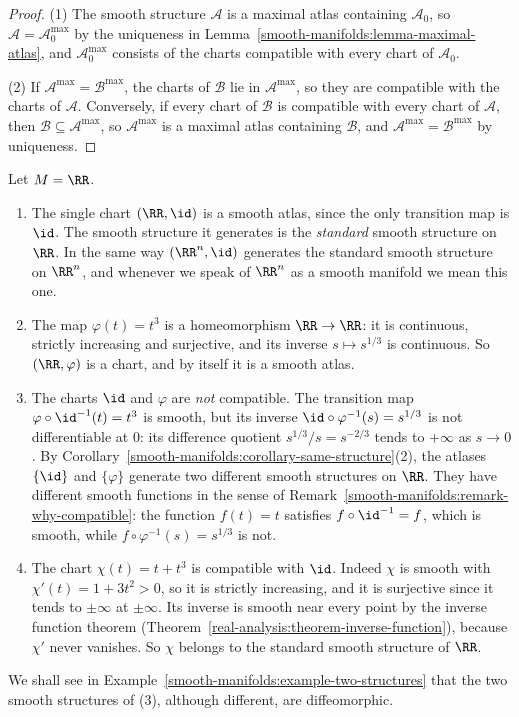 \begin{proof}
(1) The smooth structure $\mathcal{A}$ is a maximal atlas containing $\mathcal{A}_0$, so $\mathcal{A} = \mathcal{A}_0^{\max}$ by the uniqueness in
Lemma~\ref{smooth-manifolds:lemma-maximal-atlas}, and $\mathcal{A}_0^{\max}$ consists of the charts compatible with every chart of $\mathcal{A}_0$.

(2) If $\mathcal{A}^{\max} = \mathcal{B}^{\max}$, the charts of $\mathcal{B}$ lie in $\mathcal{A}^{\max}$, so they are compatible with the charts of
$\mathcal{A}$. Conversely, if every chart of $\mathcal{B}$ is compatible with every chart of $\mathcal{A}$, then $\mathcal{B} \subseteq \mathcal{A}^{\max}$,
so $\mathcal{A}^{\max}$ is a maximal atlas containing $\mathcal{B}$, and $\mathcal{A}^{\max} = \mathcal{B}^{\max}$ by uniqueness.
\end{proof}

\begin{example}\label{smooth-manifolds:example-atlases-line}
Let $M = \RR$.
\begin{enumerate}
\item The single chart $(\RR, \id)$ is a smooth atlas, since the only transition map is $\id$. The smooth structure it generates is the \emph{standard} smooth
structure on $\RR$. In the same way $(\RR^n, \id)$ generates the standard smooth structure on $\RR^n$, and whenever we speak of $\RR^n$ as a smooth manifold we
mean this one.
\item The map $\varphi(t) = t^3$ is a homeomorphism $\RR \to \RR$: it is continuous, strictly increasing and surjective, and its inverse $s \mapsto s^{1/3}$ is
continuous. So $(\RR, \varphi)$ is a chart, and by itself it is a smooth atlas.
\item The charts $\id$ and $\varphi$ are \emph{not} compatible. The transition map $\varphi \circ \id^{-1}(t) = t^3$ is smooth, but its inverse
$\id \circ \varphi^{-1}(s) = s^{1/3}$ is not differentiable at $0$: its difference quotient $s^{1/3}/s = s^{-2/3}$ tends to $+\infty$ as $s \to 0$. By
Corollary~\ref{smooth-manifolds:corollary-same-structure}(2), the atlases $\{\id\}$ and $\{\varphi\}$ generate two different smooth structures on $\RR$. They
have different smooth functions in the sense of Remark~\ref{smooth-manifolds:remark-why-compatible}: the function $f(t) = t$ satisfies
$f \circ \id^{-1} = f$, which is smooth, while $f \circ \varphi^{-1}(s) = s^{1/3}$ is not.
\item The chart $\chi(t) = t + t^3$ is compatible with $\id$. Indeed $\chi$ is smooth with $\chi'(t) = 1 + 3t^2 > 0$, so it is strictly increasing, and it is
surjective since it tends to $\pm\infty$ at $\pm\infty$. Its inverse is smooth near every point by the inverse function theorem
(Theorem~\ref{real-analysis:theorem-inverse-function}), because $\chi'$ never vanishes. So $\chi$ belongs to the standard smooth structure of $\RR$.
\end{enumerate}
We shall see in Example~\ref{smooth-manifolds:example-two-structures} that the two smooth structures of (3), although different, are diffeomorphic.
\end{example}

